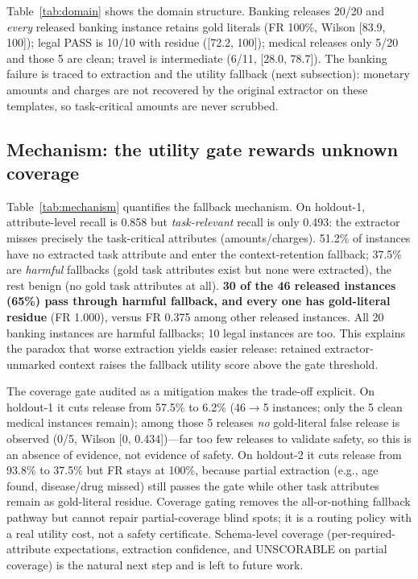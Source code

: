 \documentclass[11pt,a4paper]{article}
\begin{document}
Table~\ref{tab:domain} shows the domain structure. Banking releases 20/20 and \emph{every} released banking instance retains gold literals (FR 100\%, Wilson [83.9, 100]); legal PASS is 10/10 with residue ([72.2, 100]); medical releases only 5/20 and those 5 are clean; travel is intermediate (6/11, [28.0, 78.7]). The banking failure is traced to extraction and the utility fallback (next subsection): monetary amounts and charges are not recovered by the original extractor on these templates, so task-critical amounts are never scrubbed.

\subsection{Mechanism: the utility gate rewards unknown coverage}\label{sec:res-mech}
Table~\ref{tab:mechanism} quantifies the fallback mechanism. On holdout-1, attribute-level recall is 0.858 but \emph{task-relevant} recall is only 0.493: the extractor misses precisely the task-critical attributes (amounts/charges). 51.2\% of instances have no extracted task attribute and enter the context-retention fallback; 37.5\% are \emph{harmful} fallbacks (gold task attributes exist but none were extracted), the rest benign (no gold task attributes at all). \textbf{30 of the 46 released instances (65\%) pass through harmful fallback, and every one has gold-literal residue} (FR 1.000), versus FR 0.375 among other released instances. All 20 banking instances are harmful fallbacks; 10 legal instances are too. This explains the paradox that worse extraction yields easier release: retained extractor-unmarked context raises the fallback utility score above the gate threshold.

The coverage gate audited as a mitigation makes the trade-off explicit. On holdout-1 it cuts release from 57.5\% to 6.2\% (46$\to$5 instances; only the 5 clean medical instances remain); among those 5 releases \emph{no} gold-literal false release is observed (0/5, Wilson [0, 0.434])---far too few releases to validate safety, so this is an absence of evidence, not evidence of safety. On holdout-2 it cuts release from 93.8\% to 37.5\% but FR stays at 100\%, because partial extraction (e.g., age found, disease/drug missed) still passes the gate while other task attributes remain as gold-literal residue. Coverage gating removes the all-or-nothing fallback pathway but cannot repair partial-coverage blind spots; it is a routing policy with a real utility cost, not a safety certificate. Schema-level coverage (per-required-attribute expectations, extraction confidence, and UNSCORABLE on partial coverage) is the natural next step and is left to future work.
\end{document}
